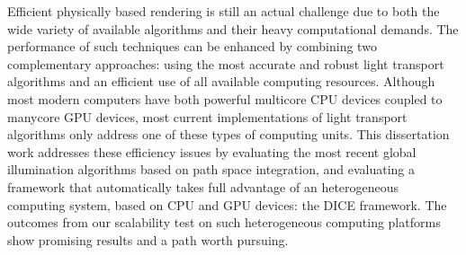 Efficient physically based rendering is still an actual challenge due to both the wide variety of available algorithms and their heavy computational demands. The performance of such techniques can be enhanced by combining two complementary approaches: using the most accurate and robust light transport algorithms and an efficient use of all available computing resources. Although most modern computers have both powerful multicore CPU devices coupled to manycore GPU devices, most current implementations of light transport algorithms only address one of these types of computing units. This dissertation work addresses these efficiency issues by evaluating the most recent global illumination algorithms based on path space integration, and evaluating a framework that automatically takes full advantage of an heterogeneous computing system, based on CPU and GPU devices: the DICE framework. The outcomes from our scalability test on such heterogeneous computing platforms show promising results and a path worth pursuing.

